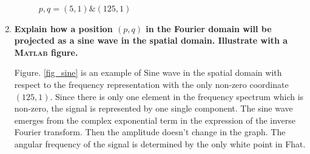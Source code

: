 \documentclass{article}
\begin{document}
\begin{enumerate}
\begin{figure}[H]
    \centering
    \caption{$p,q = (5, 1) \& (125,1)$}
    \label{fig_pair3}
\end{figure}

\item \textbf{Explain how a position $(p, q)$ in the Fourier domain will be projected as a sine wave in the spatial domain. Illustrate with a \textsc{Matlab} figure.}

Figure. \ref{fig_sine} is an example of Sine wave in the spatial domain with respect to the frequency representation with the only non-zero coordinate $(125,1)$. Since there is only one element in the frequency spectrum which is non-zero, the signal is represented by one single component. The sine wave emerges from the complex exponential term in the expression of the inverse Fourier transform. Then the amplitude doesn't change in the graph. The angular frequency of the signal is determined by the only white point in Fhat. 


\end{enumerate}
\end{document}
